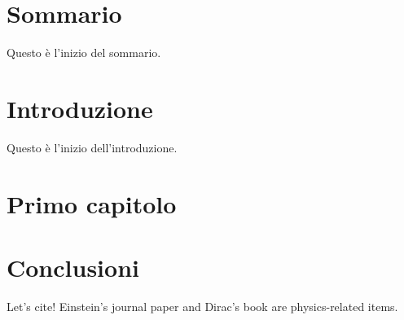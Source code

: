 \documentclass[12pt,a4paper]{report}
\begin{document}
	\chapter*{Sommario}
		Questo è l'inizio del sommario.
	\newpage
	\tableofcontents
	\newpage
	\chapter*{Introduzione}
		Questo è l'inizio dell'introduzione.
	\newpage
	
	\chapter{Primo capitolo}
	
	\chapter*{Conclusioni}
		Let's cite! Einstein's journal paper \cite{einstein} and Dirac's book \cite{dirac} are physics-related items.
	\newpage	
	\printbibliography[
		heading=bibintoc,
		title={Bibliografia}
		]
		 	
\end{document}
